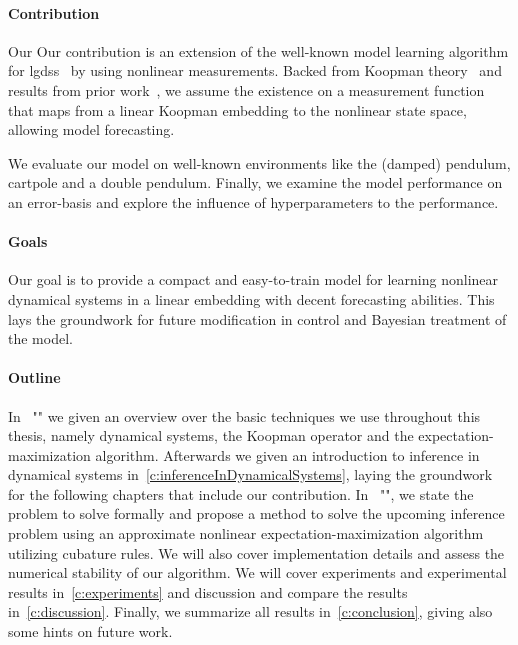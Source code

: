 \paragraph{Contribution}
	Our Our contribution is an extension of the well-known model learning algorithm for \acp{lgds}~\cite{ghahramaniParameterEstimationLinear1996,minkaHiddenMarkovModels1999} by using nonlinear measurements. Backed from Koopman theory~\cite{koopmanHamiltonianSystemsTransformation1931} and results from prior work~\cite{luschDeepLearningUniversal2018}, we assume the existence on a measurement function that maps from a linear Koopman embedding to the nonlinear state space, allowing model forecasting.

	We evaluate our model on well-known environments like the (damped) pendulum, cartpole and a double pendulum. Finally, we examine the model performance on an error-basis and explore the influence of hyperparameters to the performance.

\paragraph{Goals}
	Our goal is to provide a compact and easy-to-train model for learning nonlinear dynamical systems in a linear embedding with decent forecasting abilities. This lays the groundwork for future modification in control and Bayesian treatment of the model.

\paragraph{Outline}
	In \chapterautorefname~"" we given an overview over the basic techniques we use throughout this thesis, namely dynamical systems, the Koopman operator and the expectation-maximization algorithm. Afterwards we given an introduction to inference in dynamical systems in~\autoref{c:inferenceInDynamicalSystems}, laying the groundwork for the following chapters that include our contribution. In \chapterautorefname~"", we state the problem to solve formally and propose a method to solve the upcoming inference problem using an approximate nonlinear expectation-maximization algorithm utilizing cubature rules. We will also cover implementation details and assess the numerical stability of our algorithm. We will cover experiments and experimental results in~\autoref{c:experiments} and discussion and compare the results in~\autoref{c:discussion}. Finally, we summarize all results in~\autoref{c:conclusion}, giving also some hints on future work.
